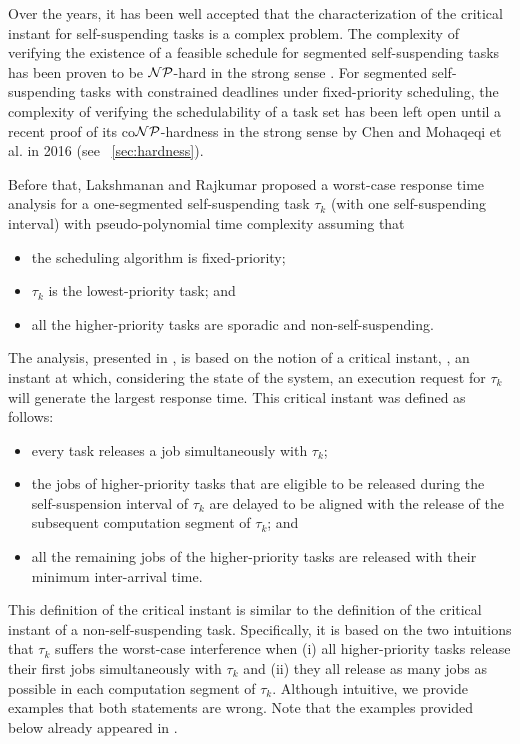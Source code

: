 Over the years, it has been well accepted that the characterization of the critical instant for self-suspending tasks is a complex problem. The complexity of verifying the existence of a feasible schedule for segmented self-suspending tasks has been proven to be ${\cal NP}$-hard in the strong sense \cite{Ridouard_2004}.  For segmented self-suspending tasks with constrained deadlines under fixed-priority scheduling, 
the complexity of verifying the schedulability of a task set has been left open until a recent proof of its co${\cal NP}$-hardness in the strong sense by Chen \cite{RTSS2016-suspension} and Mohaqeqi et al. \cite{DBLP:conf/rtns/MohaqeqiE016} in 2016 (see \mysectionref{}~\ref{sec:hardness}).

Before that, Lakshmanan and Rajkumar \cite{LR:rtas10} proposed a worst-case response time analysis for a one-segmented self-suspending task $\tau_k$ (with one self-suspending interval) with pseudo-polynomial time complexity assuming that 
\begin{itemize}
\item the scheduling algorithm is fixed-priority;
\item $\tau_k$ is the lowest-priority task;  and
\item all the higher-priority tasks are sporadic and non-self-suspending.
\end{itemize}
The analysis, presented in \cite{LR:rtas10}, is based on the notion of
a critical instant, \ie, an instant at which, considering the state of the system, an execution request for $\tau_k$ will generate the largest response time. This critical instant was defined as follows:
\begin{itemize}
	\item every task releases a job simultaneously with $\tau_k$;
	\item the jobs of higher-priority tasks that are eligible to be released during the self-suspension interval of $\tau_k$ are delayed to be aligned with the release of the subsequent computation segment of $\tau_k$; and
	\item all the remaining jobs of the higher-priority tasks are released with their minimum inter-arrival time.
\end{itemize}

This definition of the critical instant is similar to the definition of the critical instant of a non-self-suspending task. Specifically, it is based on the two intuitions that $\tau_k$ suffers the worst-case interference when (i) all higher-priority tasks release their first jobs simultaneously with $\tau_k$ and (ii) they all release as many jobs as possible in each computation segment of $\tau_k$. Although intuitive, we provide examples that both statements are wrong. Note that the examples provided below already appeared in \cite{ecrts15nelissen}.

